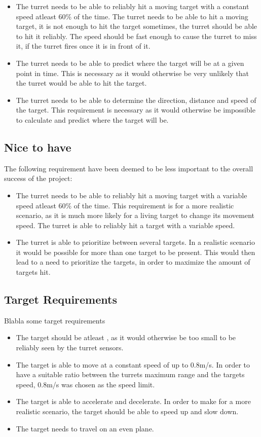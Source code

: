 \begin{itemize}
  \item The turret needs to be able to reliably hit a moving target with a
  constant speed atleast 60\% of the time. The turret needs to be able to hit a
  moving target, it is not enough to hit the target sometimes, the turret should
  be able to hit it reliably. The speed should be fast enough to cause the
  turret to miss it, if the turret fires once it is in front of it.
  \item The turret needs to be able to predict where the target will be at a given point
in time. This is necessary as it would otherwise be very unlikely that the
turret would be able to hit the target.
  \item The turret needs to be able to determine the direction, distance and speed of
the target. This requirement is necessary as it would otherwise be impossible to
calculate and predict where the target will be.
\end{itemize}

\subsection{Nice to have}
The following requirement have been deemed to be less important to the overall
success of the project:
\begin{itemize}
  \item The turret needs to be able to reliably hit a moving target with a
variable speed atleast 60\% of the time. This requirement is for a
more realistic scenario, as it is much more likely for a living target to
change its movement speed. The turret is able to reliably hit a target with a
variable speed.
  \item The turret is able to prioritize between several targets. In a realistic
scenario it would be possible for more than one target to be present. This would
then lead to a need to prioritize the targets, in order to maximize the
amount of targets hit.
\end{itemize}

\subsection{Target Requirements}
Blabla some target requirements

\begin{itemize}
  \item The target should be atleast , as it
would otherwise be too small to be reliably seen by the turret sensors.
  \item The target is able to move at a constant speed of up to 0.8m/s. In order to
have a suitable ratio between the turrets maximum range and the targets
speed, 0.8m/s was chosen as the speed limit.
  \item The target is able to accelerate and decelerate. In order to make for a
  more realistic scenario, the target should be able to speed up and slow down.
  \item The target needs to travel on an even plane.
\end{itemize}

